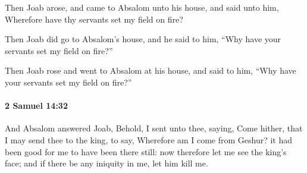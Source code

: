 			\begin{versebox}
					\item[BHS] 
					\item[ASV] Then Joab arose, and came to Absalom unto his house, and said unto him, Wherefore have thy servants set my field on fire?
					\item[NIV] Then Joab did go to Absalom’s house, and he said to him, “Why have your servants set my field on fire?”
					\item[NRSV] Then Joab rose and went to Absalom at his house, and said to him, “Why have your servants set my field on fire?”
			\end{versebox}

		\paragraph{2 Samuel 14:32} %
			\label{2SAMUEL-14-32}

			And Absalom answered Joab, Behold, I sent unto thee, saying, Come hither, that I may send thee to the king, to say, Wherefore am I come from Geshur? it had been good for me to have been there still: now therefore let me see the king’s face; and if there be any iniquity in me, let him kill me.

